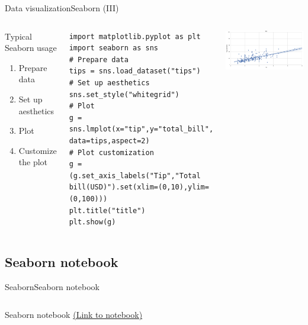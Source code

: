 \documentclass[10pt,compress]{beamer} %
\begin{document}
\begin{frame}[fragile]{Data visualization}{Seaborn (III)}
	\begin{columns}
		\begin{block}{Typical Seaborn usage}
		\begin{enumerate}
			\item Prepare data
			\item Set up aesthetics
			\item Plot
			\item Customize the plot
		\end{enumerate}
	\end{block}

		\begin{exampleblock}{}
			\vspace{-0.2cm} 
			\begin{lstlisting}[basicstyle=\tiny]
import matplotlib.pyplot as plt
import seaborn as sns
# Prepare data
tips = sns.load_dataset("tips")
# Set up aesthetics
sns.set_style("whitegrid")
# Plot
g = sns.lmplot(x="tip",y="total_bill", data=tips,aspect=2)
# Plot customization
g = (g.set_axis_labels("Tip","Total bill(USD)").set(xlim=(0,10),ylim=(0,100)))
plt.title("title")
plt.show(g)
\end{lstlisting}
		\vspace{-0.2cm} 
		\end{exampleblock}

		\includegraphics[width=\textwidth]{figs/sns-lm.png}\\
	\end{columns}
\end{frame}

\subsection{Seaborn notebook}
\begin{frame}{Seaborn}{Seaborn notebook}
    \begin{columns}
 	   \column{0.5\textwidth}
			\begin{block}{Seaborn notebook}
			\href{https://github.com/dfbarrero/dataCourse/blob/master/dataviz/DatavizWithSeaborn.ipynb}{(Link to notebook)}
			\end{block}
	\end{columns}
\end{frame}
\end{document}
